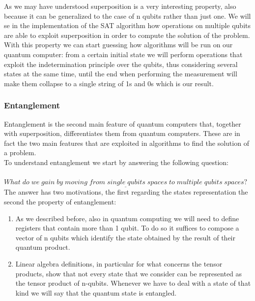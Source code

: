 \documentclass[english]{article}
\begin{document}
				As we may have understood superposition is a very interesting property, also because it can be generalized to the case of n qubits rather than just one. We will se in the implementation of the SAT algorithm how operations on multiple qubits are able to exploit superposition in order to compute the solution of the problem. With this property we can start guessing how algorithms will be run on our quantum computer: from a certain initial state we will perform operations that exploit the indetermination principle over the qubits, thus considering several states at the same time, until the end when performing the measurement will make them collapse to a single string of 1s and 0s which is our result.
			
			\subsubsection{Entanglement}
			\label{sec:entanglement}
				Entanglement is the second main feature of quantum computers that, together with superposition, differentiates them from quantum computers. These are in fact the two main features that are exploited in algorithms to find the solution of a problem. \\
				
				To understand entanglement we start by answering the following question: \\ \\				
				$\underline{What \; do \; we \; gain \; by \; moving \; from \; single \; qubits \; spaces \; to \; multiple \; qubits \; spaces?}$ \\
				
				The answer has two motivations, the first regarding the states representation the second the property of entanglement:
				\begin{enumerate}[label=(\roman*)]
					\item As we described before, also in quantum computing we will need to define registers that contain more than 1 qubit. To do so it suffices to compose a vector of n qubits which identify the state obtained by the result of their quantum product.
					
					\item Linear algebra definitions, in particular for what concerns the tensor products, show that not every state that we consider can be represented as the tensor product of n-qubits. Whenever we have to deal with a state of that kind we will say that the quantum state is entangled.
				\end{enumerate}
			
\end{document}
